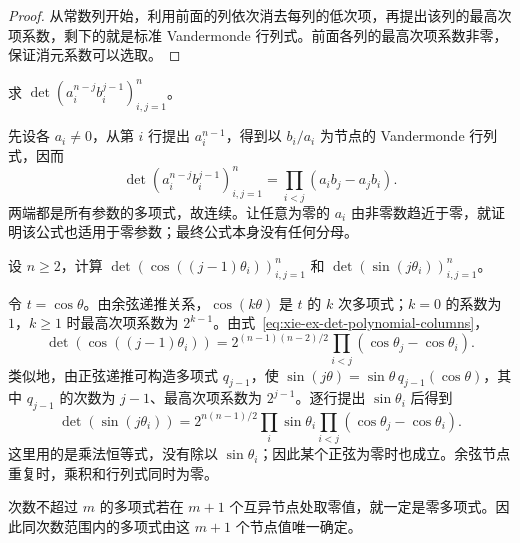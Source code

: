 \begin{proof}
从常数列开始，利用前面的列依次消去每列的低次项，再提出该列的最高次项系数，剩下的就是标准 Vandermonde 行列式。前面各列的最高次项系数非零，保证消元系数可以选取。
\end{proof}

\begin{example}
\label{ex:xie-ex-det-homogeneous-vandermonde}
求 $\det(a_i^{n-j}b_i^{j-1})_{i,j=1}^{n}$。
\end{example}

\begin{solve}
先设各 $a_i\ne0$，从第 $i$ 行提出 $a_i^{n-1}$，得到以 $b_i/a_i$ 为节点的 Vandermonde 行列式，因而
\begin{equation}
\label{eq:xie-ex-det-homogeneous-vandermonde}
\det(a_i^{n-j}b_i^{j-1})_{i,j=1}^{n}
=\prod_{i<j}(a_ib_j-a_jb_i).
\end{equation}
两端都是所有参数的多项式，故连续。让任意为零的 $a_i$ 由非零数趋近于零，就证明该公式也适用于零参数；最终公式本身没有任何分母。
\end{solve}

\begin{example}
\label{ex:xie-ex-det-trigonometric-vandermonde}
设 $n\geq2$，计算 $\det(\cos((j-1)\theta_i))_{i,j=1}^{n}$ 和 $\det(\sin(j\theta_i))_{i,j=1}^{n}$。
\end{example}

\begin{solve}
令 $t=\cos\theta$。由余弦递推关系，$\cos(k\theta)$ 是 $t$ 的 $k$ 次多项式；$k=0$ 的系数为 $1$，$k\geq1$ 时最高次项系数为 $2^{k-1}$。由式~\eqref{eq:xie-ex-det-polynomial-columns}，
\begin{equation}
\label{eq:xie-ex-det-cosine}
\det(\cos((j-1)\theta_i))
=2^{(n-1)(n-2)/2}\prod_{i<j}(\cos\theta_j-\cos\theta_i).
\end{equation}
类似地，由正弦递推可构造多项式 $q_{j-1}$，使 $\sin(j\theta)=\sin\theta\,q_{j-1}(\cos\theta)$，其中 $q_{j-1}$ 的次数为 $j-1$、最高次项系数为 $2^{j-1}$。逐行提出 $\sin\theta_i$ 后得到
\begin{equation}
\label{eq:xie-ex-det-sine}
\det(\sin(j\theta_i))
=2^{n(n-1)/2}\prod_i\sin\theta_i
\prod_{i<j}(\cos\theta_j-\cos\theta_i).
\end{equation}
这里用的是乘法恒等式，没有除以 $\sin\theta_i$；因此某个正弦为零时也成立。余弦节点重复时，乘积和行列式同时为零。
\end{solve}

\begin{corollary}
\label{cor:xie-ex-det-polynomial-uniqueness}
次数不超过 $m$ 的多项式若在 $m+1$ 个互异节点处取零值，就一定是零多项式。因此同次数范围内的多项式由这 $m+1$ 个节点值唯一确定。
\end{corollary}

